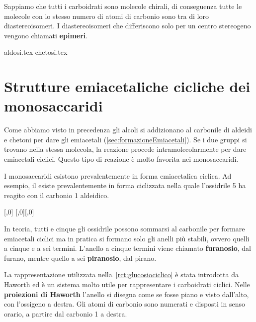 Sappiamo che tutti i carboidrati sono molecole chirali, di conseguenza tutte le molecole con lo stesso numero di atomi di carbonio sono tra di loro diastereoisomeri. I diastereoisomeri che differiscono solo per un centro stereogeno vengono chiamati \textbf{epimeri}.

{aldosi.tex}
{chetosi.tex}

\section{Strutture emiacetaliche cicliche dei monosaccaridi}
Come abbiamo visto in precedenza gli alcoli si addizionano al carbonile di aldeidi e chetoni per dare gli emiacetali (\autoref{sec:formazioneEmiacetali}). Se i due gruppi si trovano nella stessa molecola, la reazione procede intramolecolarmente per dare emiacetali ciclici. Questo tipo di reazione è molto favorita nei monosaccaridi.

I monosaccaridi esistono prevalentemente in forma emiacetalica ciclica. Ad esempio, il  esiste prevalentemente in forma ciclizzata nella quale l'ossidrile 5 ha reagito con il carbonio 1 aldeidico.
	{\small
		\begin{reaction}\label{rct:glucosiociclico}
			[,0]
			\arrow
			\chemnameinit{}
			\arrow{0}[,0]\+[,0]
		\end{reaction}
		\chemnameinit{}}
In teoria, tutti e cinque gli ossidrile possono sommarsi al carbonile per formare emiacetali ciclici ma in pratica si formano solo gli anelli più stabili, ovvero quelli a cinque e a sei termini. L'anello a cinque termini viene chiamato \textbf{furanosio}, dal furano, mentre quello a sei \textbf{piranosio}, dal pirano.

La rappresentazione utilizzata nella~\autoref{rct:glucosiociclico} è stata introdotta da Haworth ed è un sistema molto utile per rappresentare i carboidrati ciclici. Nelle \textbf{proiezioni di Haworth} l'anello si disegna come se fosse piano e visto dall'alto, con l'ossigeno a destra. Gli atomi di carbonio sono numerati e disposti in senso orario, a partire dal carbonio 1 a destra.

